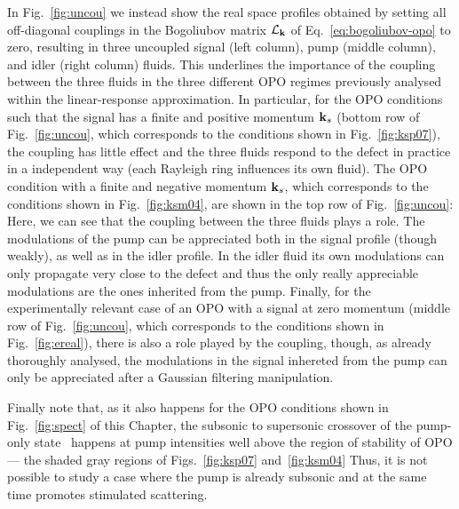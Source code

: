 \begin{subappendices}
In Fig.~\ref{fig:uncou} we instead show the real space profiles
obtained by setting all off-diagonal couplings in the Bogoliubov
matrix $\mathcal{L}_{\mathbf{k}}$ of Eq.~\eqref{eq:bogoliubov-opo} to
zero, resulting in three uncoupled signal (left column), pump (middle
column), and idler (right column) fluids. This underlines the
importance of the coupling between the three fluids in the three
different OPO regimes previously analysed within the linear-response
approximation. In particular, for the OPO conditions such that the
signal has a finite and positive momentum $\mathbf{k}_s$ (bottom row of
Fig.~\ref{fig:uncou}, which corresponds to the conditions shown in
Fig.~\ref{fig:ksp07}), the coupling has little effect and the three
fluids respond to the defect in practice in a independent way (each
Rayleigh ring influences its own fluid). The OPO condition with a
finite and negative momentum $\mathbf{k}_s$, which corresponds to the
conditions shown in Fig.~\ref{fig:ksm04}, are shown in the top row of
Fig.~\ref{fig:uncou}: Here, we can see that the coupling between the
three fluids plays a role. The modulations of the pump can be
appreciated both in the signal profile (though weakly), as well as in
the idler profile. In the idler fluid its own modulations can only
propagate very close to the defect and thus the only really
appreciable modulations are the ones inherited from the pump. Finally,
for the experimentally relevant case of an OPO with a signal at zero
momentum (middle row of Fig.~\ref{fig:uncou}, which corresponds to the
conditions shown in Fig.~\ref{fig:ereal}), there is also a role played
by the coupling, though, as already thoroughly analysed, the
modulations in the signal inhereted from the pump can only be
appreciated after a Gaussian filtering manipulation.

Finally note that, as it also happens for the OPO conditions shown in
Fig.~\ref{fig:spect} of this Chapter, the subsonic to supersonic
crossover of the pump-only state~\cite{Amo_2009} happens at pump
intensities well above the region of stability of OPO --- the shaded
gray regions of Figs.~\ref{fig:ksp07} and~\ref{fig:ksm04} Thus, it is
not possible to study a case where the pump is already subsonic and at
the same time promotes stimulated scattering.
\end{subappendices}




